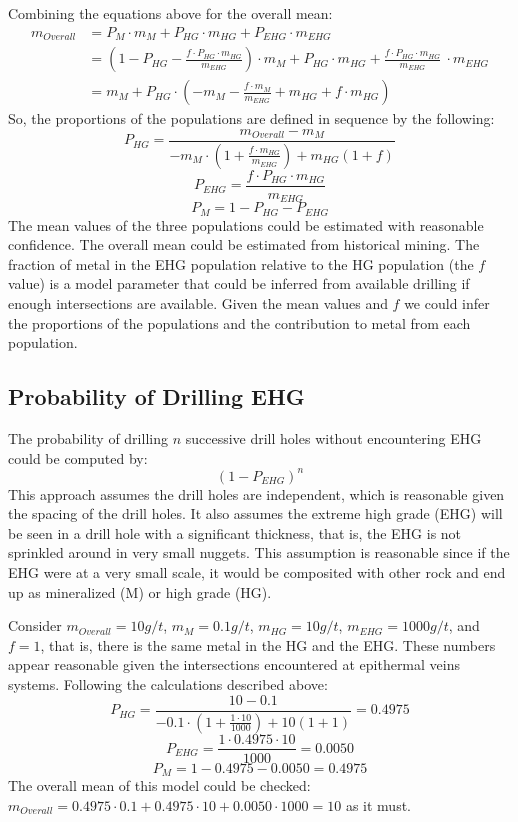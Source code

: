 Combining the equations above for the overall mean:
\begin{align}
    m_{Overall} & = P_{M} \cdot m_{M}  + P_{HG} \cdot m_{HG} + P_{EHG} \cdot m_{EHG} \nonumber                                                                                                  \\
                & = \left(1-P_{HG}-\frac{f \cdot P_{HG} \cdot m_{HG}}{m_{EHG}}\right) \cdot m_{M} + P_{HG} \cdot m_{HG} + \frac{f \cdot P_{HG} \cdot m_{HG}}{m_{EHG}} \ \cdot m_{EHG} \nonumber \\
                & = m_{M} + P_{HG} \cdot \left( -m_{M}-\frac{f \cdot m_{M}}{m_{EHG}}  + m_{HG} + f \cdot m_{HG} \right) \nonumber
\end{align}
So, the proportions of the populations are defined in sequence by the following:
\[
    P_{HG} =
    \frac{m_{Overall} - m_M}
    {
        -m_M \cdot \left( 1+\frac{f \cdot m_{HG}}{m_{EHG}}\right) + m_{HG}(1+f)
    }
\]
\[
    P_{EHG} = \frac{f \cdot P_{HG} \cdot m_{HG}}{m_{EHG}}
\]
\[
    P_{M} = 1 - P_{HG} - P_{EHG}
\]
The mean values of the three populations could be estimated with reasonable confidence. The overall mean could be estimated from historical mining. The fraction of metal in the EHG population relative to the HG population (the $f$ value) is a model parameter that could be inferred from available drilling if enough intersections are available. Given the mean values and $f$ we could infer the proportions of the populations and the contribution to metal from each population.

\FloatBarrier
\subsection{Probability of Drilling EHG}
\label{subsec:probehg}

The probability of drilling $n$ successive drill holes without encountering EHG could be computed by:
\[
    \left( 1 - P_{EHG} \right)^n
\]
This approach assumes the drill holes are independent, which is reasonable given the spacing of the drill holes. It also assumes the extreme high grade (EHG) will be seen in a drill hole with a significant thickness, that is, the EHG is not sprinkled around in very small nuggets. This assumption is reasonable since if the EHG were at a very small scale, it would be composited with other rock and end up as mineralized (M) or high grade (HG).

Consider $m_{Overall} = 10 g/t$, $m_{M} = 0.1 g/t$, $m_{HG} = 10 g/t$, $m_{EHG} = 1000 g/t$, and $f=1$, that is, there is the same metal in the HG and the EHG.  These numbers appear reasonable given the intersections encountered at epithermal veins systems. Following the calculations described above:
\[
    P_{HG} =
    \frac{10 - 0.1}
    {
        -0.1 \cdot \left( 1+\frac{1 \cdot 10}{1000}\right) + 10(1+1)
    }
    = 0.4975
\]
\[
    P_{EHG} = \frac{1 \cdot 0.4975 \cdot 10}{1000} = 0.0050
\]
\[
    P_{M} = 1 - 0.4975 - 0.0050 = 0.4975
\]
The overall mean of this model could be checked: $m_{Overall} = 0.4975 \cdot 0.1 + 0.4975 \cdot 10 + 0.0050 \cdot 1000 = 10$ as it must.

